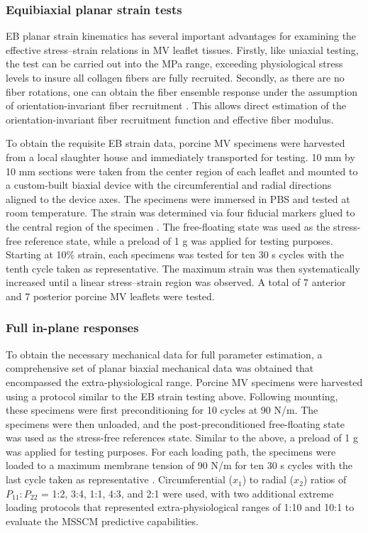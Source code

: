 \subsubsection{Equibiaxial planar strain tests}

    EB planar strain kinematics has several important advantages for examining the effective stress–strain relations in MV leaflet tissues. Firstly, like uniaxial testing, the test can be carried out into the MPa range, exceeding physiological stress levels to insure all collagen fibers are fully recruited. Secondly, as there are no fiber rotations, one can obtain the fiber ensemble response under the assumption of orientation-invariant fiber recruitment \cite{fata_insights_2014,sacks_incorporation_2003,fan_simulation_2014}. This allows direct estimation of the orientation-invariant fiber recruitment function and effective fiber modulus.
    
    
    To obtain the requisite EB strain data, porcine MV specimens were harvested from a local slaughter house and immediately transported for testing. 10 mm by 10 mm sections were taken from the center region of each leaflet and mounted to a custom-built biaxial device \cite{grashow_biaxial_2006,grashow_planar_2006} with the circumferential and radial directions aligned to the device axes. The specimens were immersed in PBS and tested at room temperature. The strain was determined via four fiducial markers glued to the central region of the specimen \cite{billiar_biaxial_2000}. The free-floating state was used as the stress-free reference state, while a preload of 1 g was applied for testing purposes. Starting at 10\% strain, each specimens was tested for ten 30 s cycles with the tenth cycle taken as representative. The maximum strain was then systematically increased until a linear stress–strain region was observed. A total of 7 anterior and 7 posterior porcine MV leaflets were tested.


\subsubsection{Full in-plane responses}

    To obtain the necessary mechanical data for full parameter estimation, a comprehensive set of planar biaxial mechanical data was obtained that encompassed the extra-physiological range. Porcine MV specimens were harvested using a protocol similar to the EB strain testing above. Following mounting, these specimens were first preconditioning for 10 cycles at 90 N/m. The specimens were then unloaded, and the post-preconditioned free-floating state was used as the stress-free references state. Similar to the above, a preload of 1 g was applied for testing purposes. For each loading path, the specimens were loaded to a maximum membrane tension of 90 N/m for ten 30 s cycles with the last cycle taken as representative \cite{grashow_biaxial_2006,grashow_planar_2006}. Circumferential ($x_1$) to radial ($x_2$) ratios of $P_{11}:P_{22}$ = 1:2, 3:4, 1:1, 4:3, and 2:1 were used, with two additional extreme loading protocols that represented extra-physiological ranges of 1:10 and 10:1 to evaluate the MSSCM predictive capabilities.
    
